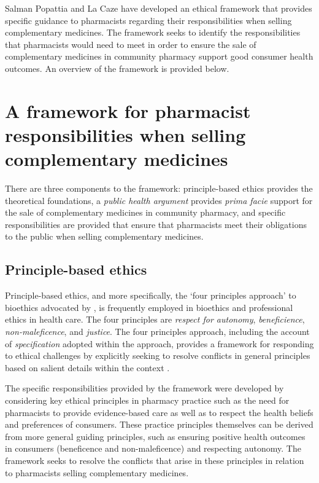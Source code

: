 \documentclass[12pt,]{article}
\begin{document}
Salman Popattia and La Caze have developed an ethical framework that
provides specific guidance to pharmacists regarding their
responsibilities when selling complementary medicines. The framework
seeks to identify the responsibilities that pharmacists would need to
meet in order to ensure the sale of complementary medicines in community
pharmacy support good consumer health outcomes. An overview of the
framework is provided below.

\section{A framework for pharmacist responsibilities when selling
complementary
medicines}\label{a-framework-for-pharmacist-responsibilities-when-selling-complementary-medicines}

There are three components to the framework: principle-based ethics
provides the theoretical foundations, a \emph{public health argument}
provides \emph{prima facie} support for the sale of complementary
medicines in community pharmacy, and specific responsibilities are
provided that ensure that pharmacists meet their obligations to the
public when selling complementary medicines.

\subsection{Principle-based ethics}\label{principle-based-ethics}

Principle-based ethics, and more specifically, the `four principles
approach' to bioethics advocated by \textcite{Beauchamp2012}, is
frequently employed in bioethics and professional ethics in health care.
The four principles are \emph{respect for autonomy},
\emph{beneficience}, \emph{non-maleficence}, and \emph{justice}. The
four principles approach, including the account of \emph{specification}
adopted within the approach, provides a framework for responding to
ethical challenges by explicitly seeking to resolve conflicts in general
principles based on salient details within the context
\autocite{Richardson2000}.

The specific responsibilities provided by the framework were developed
by considering key ethical principles in pharmacy practice such as the
need for pharmacists to provide evidence-based care as well as to
respect the health beliefs and preferences of consumers. These practice
principles themselves can be derived from more general guiding
principles, such as ensuring positive health outcomes in consumers
(beneficence and non-maleficence) and respecting autonomy. The framework
seeks to resolve the conflicts that arise in these principles in
relation to pharmacists selling complementary medicines.
\end{document}
